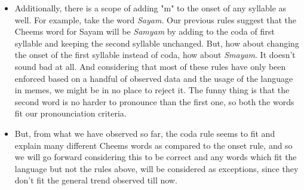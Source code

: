 \documentclass{article}
\begin{document}
\begin{itemize}
    \item Additionally, there is a scope of adding "m" to the onset of any syllable as well. For example, take the word \textit{Sayam}. Our previous rules suggest that the Cheems word for Sayam will be \textit{Samyam} by adding to the coda of first syllable and keeping the second syllable unchanged. But, how about changing the onset of the first syllable instead of coda, how about \textit{Smayam}. It doesn't sound bad at all. And considering that most of these rules have only been enforced based on a handful of observed data and the usage of the language in memes, we might be in no place to reject it. The funny thing is that the second word is no harder to pronounce than the first one, so both the words fit our pronounciation criteria.

    \item But, from what we have observed so far, the coda rule seems to fit and explain many different Cheems words as compared to the onset rule, and so we will go forward considering this to be correct and any words which fit the language but not the rules above, will be considered as exceptions, since they don't fit the general trend observed till now.
\end{itemize}
\end{document}
